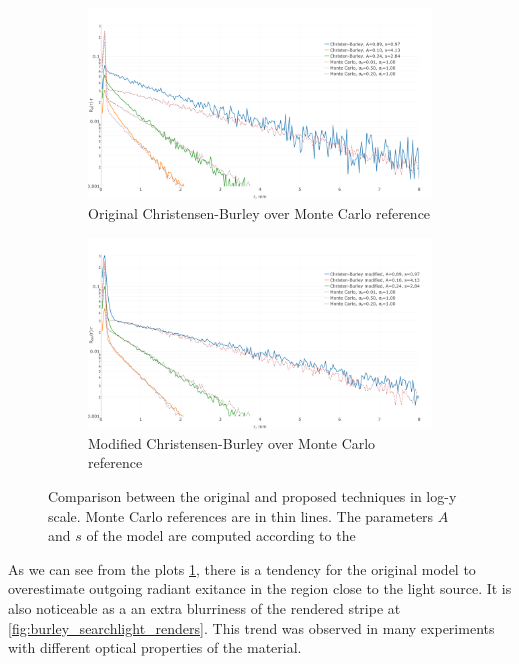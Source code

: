 \begin{figure}[h]
    \centering
    \begin{subfigure}{\textwidth}
        \includegraphics[width=\textwidth]{imgs/plots/cb_original_fitting}
        \caption{Original Christensen-Burley over Monte Carlo reference}
    \end{subfigure}
    \begin{subfigure}{\textwidth}
        \includegraphics[width=\textwidth]{imgs/plots/cb_modified_fitting}
        \caption{Modified Christensen-Burley over Monte Carlo reference}
    \end{subfigure}

    \caption{Comparison between the original and proposed techniques in log-y
    scale. Monte Carlo references are in thin lines. The parameters $A$ and $s$ of the model are
    computed according to the }
    \label{fig:burley_fitting}
\end{figure}

As we can see from the plots \ref{fig:burley_fitting}, there is a tendency for
the original model to overestimate outgoing radiant exitance in the region close
to the light source. It is also noticeable as a an extra blurriness of the rendered stripe at
\ref{fig:burley_searchlight_renders}. This trend was observed in many experiments with different optical
properties of the material.


